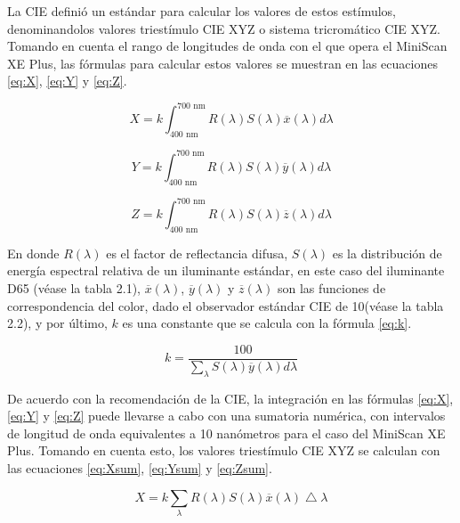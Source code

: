 		La CIE defini\'{o} un est\'{a}ndar para calcular los valores de estos est\'{i}mulos, denominandolos valores triest\'{i}mulo CIE XYZ o sistema tricrom\'{a}tico CIE XYZ. Tomando en cuenta el rango de longitudes de onda con el que opera el \mbox{MiniScan} XE Plus, las f\'{o}rmulas para calcular estos valores se muestran en las ecuaciones \ref{eq:X}, \ref{eq:Y} y \ref{eq:Z}.
		
		\begin{equation}\label{eq:X}
			X = k \int_{400 \text{ nm}}^{700 \text{ nm}} R(\lambda) S(\lambda) \overline{x}(\lambda)d\lambda
		\end{equation}
		
		\begin{equation}\label{eq:Y}
			Y = k \int_{400 \text{ nm}}^{700 \text{ nm}} R(\lambda) S(\lambda) \overline{y}(\lambda)d\lambda
		\end{equation}
		
		\begin{equation}\label{eq:Z}
			Z = k \int_{400 \text{ nm}}^{700 \text{ nm}} R(\lambda) S(\lambda) \overline{z}(\lambda)d\lambda
		\end{equation}				
		
		En donde $R(\lambda)$ es el factor de reflectancia difusa, $S(\lambda)$ es la distribuci\'{o}n de energ\'{i}a espectral relativa de un iluminante est\'{a}ndar, en este caso del iluminante D65 (v\'{e}ase la tabla 2.1), $\overline{x}(\lambda)$, $\overline{y}(\lambda)$ y $\overline{z}(\lambda)$ son las funciones de correspondencia del color, dado el observador est\'{a}ndar CIE de 10\degree (v\'{e}ase la tabla 2.2), y por \'{u}ltimo, $k$ es una constante que se calcula con la f\'{o}rmula \ref{eq:k}.
		
		\begin{equation}\label{eq:k}
			k = \frac{100}{\sum_{\lambda} S(\lambda) \overline{y}(\lambda)d\lambda}
		\end{equation}
		
		De acuerdo con la recomendaci\'{o}n de la CIE, la integraci\'{o}n en las f\'{o}rmulas \ref{eq:X}, \ref{eq:Y} y \ref{eq:Z} puede llevarse a cabo con una sumatoria num\'{e}rica, con intervalos de longitud de onda equivalentes a 10 nan\'{o}metros para el caso del MiniScan XE Plus. Tomando en cuenta esto, los valores triest\'{i}mulo CIE XYZ se calculan con las ecuaciones \ref{eq:Xsum}, \ref{eq:Ysum} y \ref{eq:Zsum}.
		
		\begin{equation}\label{eq:Xsum}
			X = k \sum_{\lambda} R(\lambda) S(\lambda) \overline{x}(\lambda)\bigtriangleup\lambda
		\end{equation}
		
